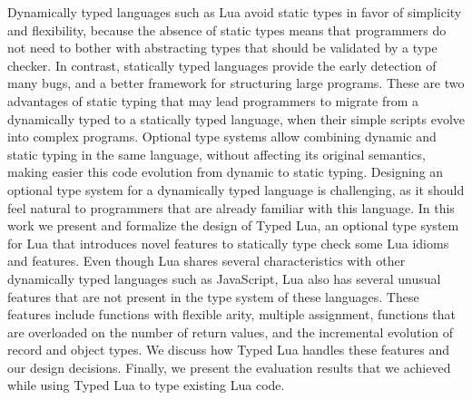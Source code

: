 Dynamically typed languages such as Lua avoid static types in favor of
simplicity and flexibility, because the absence of static types means
that programmers do not need to bother with abstracting types that
should be validated by a type checker.
In contrast, statically typed languages provide the early detection of
many bugs, and a better framework for structuring large programs.
These are two advantages of static typing that may lead programmers
to migrate from a dynamically typed to a statically typed language,
when their simple scripts evolve into complex programs.
Optional type systems allow combining dynamic and static typing in
the same language, without affecting its original semantics,
making easier this code evolution from dynamic to static typing.
Designing an optional type system for a dynamically typed language
is challenging, as it should feel natural to programmers that are
already familiar with this language.
In this work we present and formalize the design of Typed Lua,
an optional type system for Lua that introduces novel features
to statically type check some Lua idioms and features.
Even though Lua shares several characteristics with other dynamically
typed languages such as JavaScript, Lua also has several unusual features
that are not present in the type system of these languages.
These features include functions with flexible arity, multiple assignment,
functions that are overloaded on the number of return values, and the
incremental evolution of record and object types.
We discuss how Typed Lua handles these features and our design decisions.
Finally, we present the evaluation results that we achieved while using
Typed Lua to type existing Lua code.
